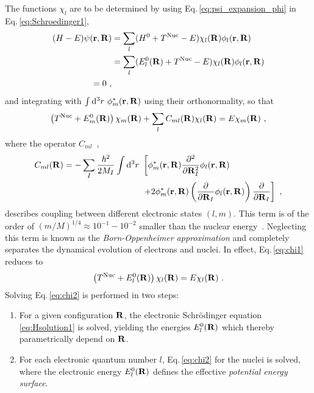 The functions $\chi_l$ are to be determined by using Eq.\,\eqref{eq:psi_expansion_phi} in Eq.\,\eqref{eq:Schroedinger1},
\begin{align}
    (H - E) \psi ({\bf r}, {\bf R})
        & = \sum_l (H^0 + T^{\rm Nuc} - E) \chi_l ({\bf R}) \phi_l ({\bf r}, {\bf R}) \nonumber \\
        &= \sum_l (E^0_l({\bf R}) + T^{\rm Nuc} - E) \chi_l ({\bf R}) \phi_l ({\bf r}, {\bf R}) \\
    = 0 \nonumber~,
\end{align}
and integrating with $\int {\rm d}^3 r ~ \phi^\ast_m ({\bf r}, {\bf R})$ using their orthonormality, so that
\begin{align}
    \left( T^{\rm Nuc} + E^0_m({\bf R}) \right) \chi_m ({\bf R})
        + \sum_l C_{ml} ({\bf R}) \chi_l ({\bf R})
        = E \chi_m ({\bf R})~,
    \label{eq:chi1}
\end{align}
where the operator $C_{ml}$~,
\begin{align}
    C_{ml} ({\bf R})
        = - \sum_I \frac{\hbar^2}{2 M_I} \int {\rm d}^3 r ~ 
        &\left[ \phi^\ast_m ({\bf r}, {\bf R}) \frac{\partial^2}{\partial {\bf R}_I^2}
            \phi_l ({\bf r}, {\bf R}) \right. \nonumber \\
        &\left.
            + 2 \phi^\ast_m ({\bf r}, {\bf R}) \left(
                \frac{\partial}{\partial {\bf R}_I} \phi_l ({\bf r}, {\bf R}) \right)
            \frac{\partial}{\partial {\bf R}_I}
        \right]~,
    \label{eq:Aml}
\end{align}
describes coupling between different electronic states $(l, m)$. This term is of the order of $(m/M)^{1/4} \approx 10^{-1} - 10^{-2}$ smaller than the nuclear energy~\cite{BornOppenheimer}. Neglecting this term is known as the \emph{Born-Oppenheimer approximation} and completely separates the dynamical evolution of electrons and nuclei. In effect, Eq.\,\eqref{eq:chi1} reduces to
\begin{align}
    \left( T^{\rm Nuc} + E^0_l({\bf R}) \right) \chi_l ({\bf R})
        = E \chi_l ({\bf R})~.
    \label{eq:chi2}
\end{align}
Solving Eq.\,\eqref{eq:chi2} is performed in two steps:
\begin{enumerate}
    \item For a given configuration $\bf R$, the electronic Schr\"odinger equation \eqref{eq:Hsolution1} is solved, yielding the energies $E^0_l({\bf R})$ which thereby parametrically depend on $\bf R$.
    \item For each electronic quantum number $l$, Eq.\,\eqref{eq:chi2} for the nuclei is solved, where the electronic energy $E^0_l({\bf R})$ defines the effective \emph{potential energy surface}.
\end{enumerate}
